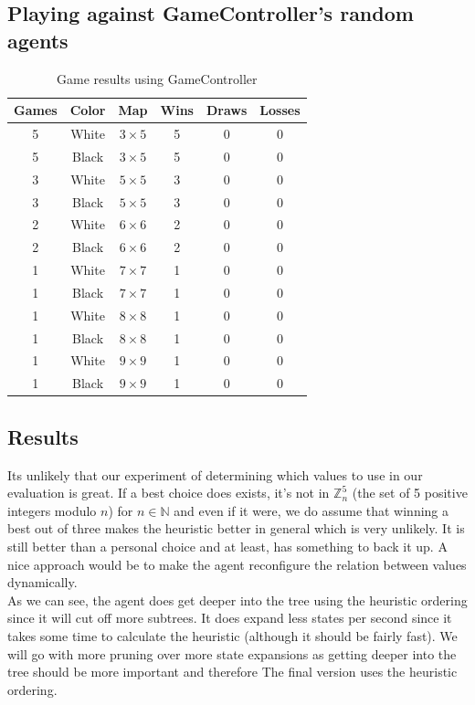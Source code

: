 \documentclass[11pt,a4paper,notitlepage]{article}
\newcommand{\N}{\mathbb{N}} %
\newcommand{\Z}{\mathbb{Z}} %
\begin{document}
\subsection{Playing against GameController's random agents}
\begin{table}[H]
\begin{center}
\begin{tabular}{c|c|c|c|c|c}
Games & Color & Map & Wins & Draws & Losses \\
\hline
\hline
5 & White & $3\times 5$ & 5 & 0 & 0 \\
5 & Black & $3\times 5$ & 5 & 0 & 0 \\
\hline
3 & White & $5 \times 5$ & 3 & 0 & 0 \\
3 & Black & $5 \times 5$ & 3 & 0 & 0 \\
\hline
2 & White & $6 \times 6$ & 2 & 0 & 0 \\
2 & Black & $6 \times 6$ & 2 & 0 & 0 \\
\hline
1 & White & $7 \times 7$ & 1 & 0 & 0 \\
1 & Black & $7 \times 7$ & 1 & 0 & 0 \\
\hline
1 & White & $8 \times 8$ & 1 & 0 & 0 \\
1 & Black & $8 \times 8$ & 1 & 0 & 0 \\
\hline
1 & White & $9 \times 9$ & 1 & 0 & 0 \\
1 & Black & $9 \times 9$ & 1 & 0 & 0 \\
\end{tabular}
\end{center}
\caption{Game results using GameController}
\label{table:gamectrlr}
\end{table}


\subsection{Results}
Its unlikely that our experiment of determining which values to use in our evaluation is great. If a best choice does exists, it's not in $\Z_n^5$ (the set of 5 positive integers modulo $n$) for $n\in\N$ and even if it were, we do assume that winning a best out of three makes the heuristic better in general which is very unlikely. It is still better than a personal choice and at least, has something to back it up. A nice approach would be to make the agent reconfigure the relation between values dynamically.\\

As we can see, the agent does get deeper into the tree using the heuristic ordering since it will cut off more subtrees. It does expand less states per second since it takes some time to calculate the heuristic (although it should be fairly fast). We will go with more pruning over more state expansions as getting deeper into the tree should be more important and therefore The final version uses the heuristic ordering.\\
\end{document}
